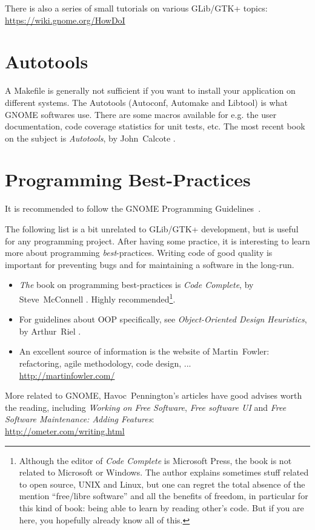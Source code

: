 There is also a series of small tutorials on various GLib/GTK+ topics:\\
\url{https://wiki.gnome.org/HowDoI}

\section{Autotools}

A Makefile is generally not sufficient if you want to install your application on different systems. The Autotools (Autoconf, Automake and Libtool) is what GNOME softwares use. There are some macros available for e.g. the user documentation, code coverage statistics for unit tests, etc. The most recent book on the subject is \emph{Autotools}, by John~Calcote \cite{autotools}.

\section{Programming Best-Practices}

It is recommended to follow the GNOME Programming Guidelines~\cite{gnome-programming-guidelines}.

The following list is a bit unrelated to GLib/GTK+ development, but is useful for any programming project. After having some practice, it is interesting to learn more about programming \emph{best}-practices. Writing code of good quality is important for preventing bugs and for maintaining a software in the long-run.

\begin{itemize}
  \item \emph{The} book on programming best-practices is \emph{Code Complete}, by Steve~McConnell \cite{code-complete}. Highly recommended\footnote{Although the editor of \emph{Code Complete} is Microsoft Press, the book is not related to Microsoft or Windows. The author explains sometimes stuff related to open source, UNIX and Linux, but one can regret the total absence of the mention ``free/libre software'' and all the benefits of freedom, in particular for this kind of book: being able to learn by reading other's code. But if you are here, you hopefully already know all of this.}.

  \item For guidelines about OOP specifically, see \emph{Object-Oriented Design Heuristics}, by Arthur~Riel \cite{oop-book}.

  \item An excellent source of information is the website of Martin~Fowler: refactoring, agile methodology, code design, ...\\
  \url{http://martinfowler.com/}
\end{itemize}

More related to GNOME, Havoc~Pennington's articles have good advises worth the reading, including \emph{Working on Free Software}, \emph{Free software UI} and \emph{Free Software Maintenance: Adding Features}:\\
\url{http://ometer.com/writing.html}
